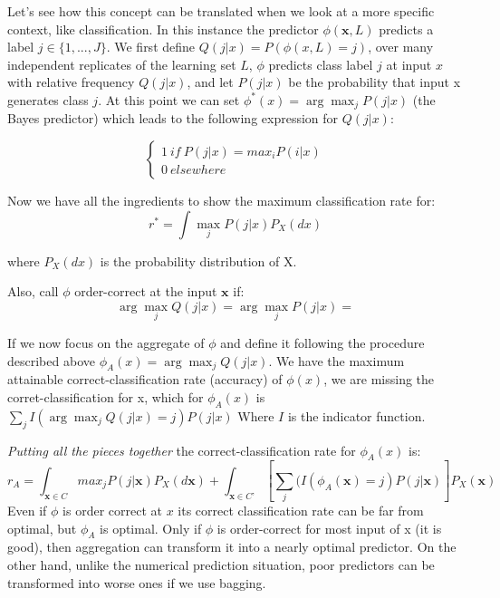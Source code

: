 \documentclass[
]{article}
\begin{document}
Let's see how this concept can be translated when we look at a more
specific context, like classification. In this instance the predictor
\(\phi(\pmb x,L)\) predicts a label \(j \in \{1,..., J\}\). We first
define \(Q(j|x)=P(\phi(x,L)=j)\), over many independent replicates of
the learning set \(L\), \(\phi\) predicts class label \(j\) at input
\(x\) with relative frequency \(Q(j|x)\), and let \(P(j|x)\) be the
probability that input x generates class \(j\). At this point we can set
\(\phi^*(x)= \arg \max _j P(j|x)\) (the Bayes predictor) which leads to
the following expression for \(Q (j |x)\):

\[
\begin{cases}
1 \ if \ P(j|x)=max_iP(i|x) \\
0 \ elsewhere
\end{cases}
\]

Now we have all the ingredients to show the maximum classification rate
for: \begin{equation}
r^*=\int \max_j P(j|x) P_X(dx)\label{eq:class_max}
\end{equation}

where \(P_X(dx)\) is the probability distribution of X.

Also, call \(\phi\) order-correct at the input \(\pmb x\) if:
\begin{equation}
\arg \max_j Q(j|x)=\arg \max_j P(j|x)=\label{eq:ord_corr}
\end{equation}

If we now focus on the aggregate of \(\phi\) and define it following the
procedure described above \(\phi_A(x)=\arg \max_j Q(j|x)\). We have the
maximum attainable correct-classification rate (accuracy) of
\(\phi(x)\), we are missing the corret-classification for x, which for
\(\phi_A(x)\) is \(\sum_j I(\arg \max_j Q(j|x)=j)P(j|x)\) Where \(I\) is
the indicator function.

\emph{Putting all the pieces together} the correct-classification rate
for \(\phi_A(x)\) is: \begin{equation}
r_A=\int_{\pmb x \in C} max_j P(j| \pmb x) P_X(d \pmb x)+ \int_{\pmb x \in C’} [\sum_j(I(\phi_A(\pmb x)=j)P(j|\pmb x)] P_X(\pmb x)
\label{eq:class_res}
\end{equation} Even if \(\phi\) is order correct at \(x\) its correct
classification rate can be far from optimal, but \(\phi_A\) is optimal.
Only if \(\phi\) is order-correct for most input of x (it is good), then
aggregation can transform it into a nearly optimal predictor. On the
other hand, unlike the numerical prediction situation, poor predictors
can be transformed into worse ones if we use bagging.
\end{document}
